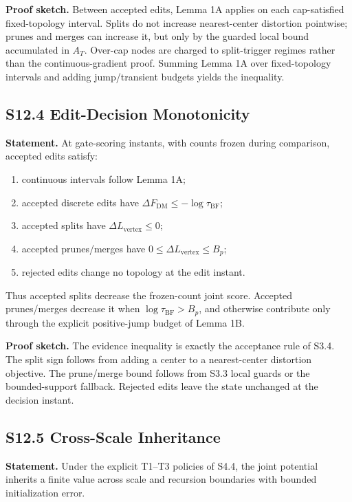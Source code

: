 \documentclass[11pt]{article}
\begin{document}
\textbf{Proof sketch.} Between accepted edits, Lemma 1A applies on each cap-satisfied fixed-topology interval. Splits do not increase nearest-center distortion pointwise; prunes and merges can increase it, but only by the guarded local bound accumulated in $A_T$. Over-cap nodes are charged to split-trigger regimes rather than the continuous-gradient proof. Summing Lemma 1A over fixed-topology intervals and adding jump/transient budgets yields the inequality.

\subsection*{S12.4 Edit-Decision Monotonicity}
\textbf{Statement.} At gate-scoring instants, with counts frozen during comparison, accepted edits satisfy:
\begin{enumerate}[leftmargin=1.5em]
  \item continuous intervals follow Lemma 1A;
  \item accepted discrete edits have $\Delta F_{\mathrm{DM}}\le-\log\tau_{\mathrm{BF}}$;
  \item accepted splits have $\Delta L_{\mathrm{vertex}}\le0$;
  \item accepted prunes/merges have $0\le\Delta L_{\mathrm{vertex}}\le B_p$;
  \item rejected edits change no topology at the edit instant.
\end{enumerate}
Thus accepted splits decrease the frozen-count joint score. Accepted prunes/merges decrease it when $\log\tau_{\mathrm{BF}}>B_p$, and otherwise contribute only through the explicit positive-jump budget of Lemma 1B.

\textbf{Proof sketch.} The evidence inequality is exactly the acceptance rule of S3.4. The split sign follows from adding a center to a nearest-center distortion objective. The prune/merge bound follows from S3.3 local guards or the bounded-support fallback. Rejected edits leave the state unchanged at the decision instant.

\subsection*{S12.5 Cross-Scale Inheritance}
\textbf{Statement.} Under the explicit T1--T3 policies of S4.4, the joint potential inherits a finite value across scale and recursion boundaries with bounded initialization error.
\end{document}

